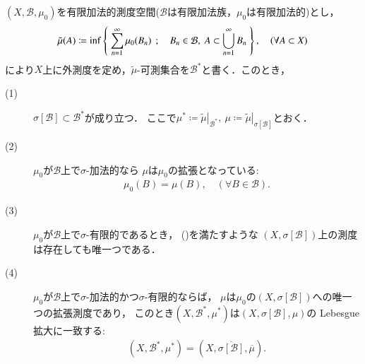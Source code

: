 		\begin{screen}
			\begin{thm}\label{thm:appendix_Kolmogorov_Hopf}
				$(X,\mathcal{B},\mu_0)$を有限加法的測度空間($\mathcal{B}$は有限加法族，$\mu_0$は有限加法的)とし，
				\begin{align}
					\tilde{\mu}(A) \coloneqq \operatorname*{inf}_{} \left\{\ \sum_{n=1}^\infty \mu_0(B_n)\ \, ; \quad B_n \in \mathcal{B},\ A \subset \bigcup_{n=1}^\infty B_n\ \right\},
					\quad (\forall A \subset X)
				\end{align}
				により$X$上に外測度を定め，$\tilde{\mu}$-可測集合を$\mathcal{B}^*$と書く．このとき，
				\begin{description}
					\item[(1)] $\sigma[\mathcal{B}] \subset \mathcal{B}^*$が成り立つ．
						ここで$\mu^* \coloneqq\left.\tilde{\mu}\right|_{\mathcal{B}^*},
						\ \mu \coloneqq \left.\tilde{\mu}\right|_{\sigma[\mathcal{B}]}$とおく．
					\item[(2)] $\mu_0$が$\mathcal{B}$上で$\sigma$-加法的なら
						$\mu$は$\mu_0$の拡張となっている:
						\begin{align}
							\mu_0(B) = \mu(B),\quad (\forall B \in \mathcal{B}).
							\label{eq:appendix_finite_additive_measure_expansion_1}
						\end{align}
						
					\item[(3)] $\mu_0$が$\mathcal{B}$上で$\sigma$-有限的であるとき，
						()を満たすような
						$\left( X,\sigma[\mathcal{B}] \right)$上の測度は存在しても唯一つである．
					
					\item[(4)] $\mu_0$が$\mathcal{B}$上で$\sigma$-加法的かつ$\sigma$-有限的ならば，
						$\mu$は$\mu_0$の$\left( X,\sigma[\mathcal{B}] \right)$への唯一つの拡張測度であり，
						このとき$\left( X,\mathcal{B}^*,\mu^* \right)$は$(X,\sigma[\mathcal{B}],\mu)$の
						Lebesgue拡大に一致する:
						\begin{align}
							\left( X,\mathcal{B}^*,\mu^* \right) 
							= \left( X,\overline{\sigma[\mathcal{B}]},\overline{\mu} \right).
							\label{eq:appendix_finite_additive_measure_expansion_5}
						\end{align}
				\end{description}
			\end{thm}
		\end{screen}
		
